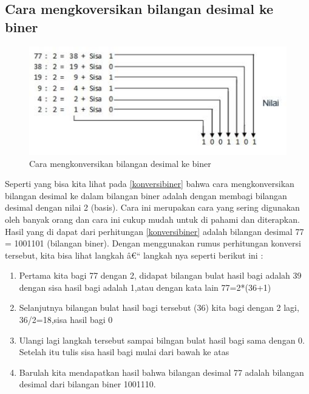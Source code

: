{\begin{itemize}
\begin{itemize}
\subsection{Cara mengkoversikan bilangan desimal ke biner}
\begin{figure}[ht]
\centerline{\includegraphics[width=1\textwidth]{figures/konversibiner.JPG}}
\caption{Cara mengkonversikan bilangan desimal ke biner}
\label{Contoh Konversi Bilangan Desimal}
\end{figure}
Seperti yang bisa kita lihat pada \ref{konversibiner} bahwa cara mengkonversikan bilangan desimal ke dalam bilangan biner adalah dengan membagi bilangan desimal dengan nilai 2 (basis). Cara ini merupakan cara yang sering digunakan oleh banyak orang dan cara ini cukup mudah untuk di pahami dan diterapkan. Hasil yang di dapat dari perhitungan \ref{konversibiner} adalah bilangan desimal 77 = 1001101 (bilangan biner). Dengan menggunakan rumus perhitungan konversi tersebut, kita bisa lihat langkah â€“ langkah nya seperti berikut ini : 
\begin{enumerate}
	\item Pertama kita bagi 77 dengan 2, didapat bilangan bulat hasil bagi adalah 39 dengan sisa hasil bagi adalah 1,atau dengan kata lain 77=2*(36+1)
	\item Selanjutnya bilangan bulat hasil bagi tersebut (36) kita bagi dengan 2 lagi, 36/2=18,sisa hasil bagi 0
	\item Ulangi lagi langkah tersebut sampai bilngan bulat hasil bagi sama dengan 0. Setelah itu tulis sisa hasil bagi mulai dari bawah ke atas
	\item Barulah kita mendapatkan hasil bahwa bilangan desimal 77 adalah bilangan desimal dari bilangan biner 1001110.
\end{enumerate}



\end{itemize}
\end{itemize}}
